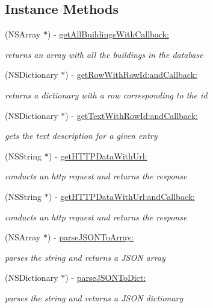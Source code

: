 \subsection*{Instance Methods}
\begin{DoxyCompactItemize}
\item 
(N\-S\-Array $\ast$) -\/ \hyperlink{interface_d_b_wrapper_a79ba74edfcd452ac40313d0b8a3a7079}{get\-All\-Buildings\-With\-Callback\-:}
\begin{DoxyCompactList}\small\item\em returns an array with all the buildings in the database \end{DoxyCompactList}\item 
(N\-S\-Dictionary $\ast$) -\/ \hyperlink{interface_d_b_wrapper_a134d1555bd56b3b371d743b86db98b65}{get\-Row\-With\-Row\-Id\-:and\-Callback\-:}
\begin{DoxyCompactList}\small\item\em returns a dictionary with a row corresponding to the id \end{DoxyCompactList}\item 
(N\-S\-Dictionary $\ast$) -\/ \hyperlink{interface_d_b_wrapper_ade09238319808eb9cc3725f3bf54491b}{get\-Text\-With\-Row\-Id\-:and\-Callback\-:}
\begin{DoxyCompactList}\small\item\em gets the text description for a given entry \end{DoxyCompactList}\item 
(N\-S\-String $\ast$) -\/ \hyperlink{interface_d_b_wrapper_a0a82e82437868cd01a5c8340944733c2}{get\-H\-T\-T\-P\-Data\-With\-Url\-:}
\begin{DoxyCompactList}\small\item\em conducts an http request and returns the response \end{DoxyCompactList}\item 
(N\-S\-String $\ast$) -\/ \hyperlink{interface_d_b_wrapper_a23a0e365500a280f65ea1b703f101f3e}{get\-H\-T\-T\-P\-Data\-With\-Url\-:and\-Callback\-:}
\begin{DoxyCompactList}\small\item\em conducts an http request and returns the response \end{DoxyCompactList}\item 
(N\-S\-Array $\ast$) -\/ \hyperlink{interface_d_b_wrapper_a022262bbc0a19c048ce21b2f89730180}{parse\-J\-S\-O\-N\-To\-Array\-:}
\begin{DoxyCompactList}\small\item\em parses the string and returns a J\-S\-O\-N array \end{DoxyCompactList}\item 
(N\-S\-Dictionary $\ast$) -\/ \hyperlink{interface_d_b_wrapper_ae0a365a9a129753aa965767a75fd12ae}{parse\-J\-S\-O\-N\-To\-Dict\-:}
\begin{DoxyCompactList}\small\item\em parses the string and returns a J\-S\-O\-N dictionary \end{DoxyCompactList}\end{DoxyCompactItemize}


